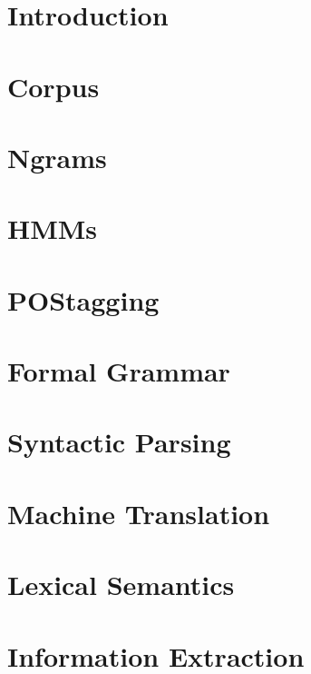\documentclass[12pt]{article} %
\begin{document}
\section{Introduction}


\section{Corpus}


\section{Ngrams}


\section{HMMs}


\section{POStagging}


\section{Formal Grammar}


\section{Syntactic Parsing}


\section{Machine Translation}


\section{Lexical Semantics}


\section{Information Extraction}



\end{document}
